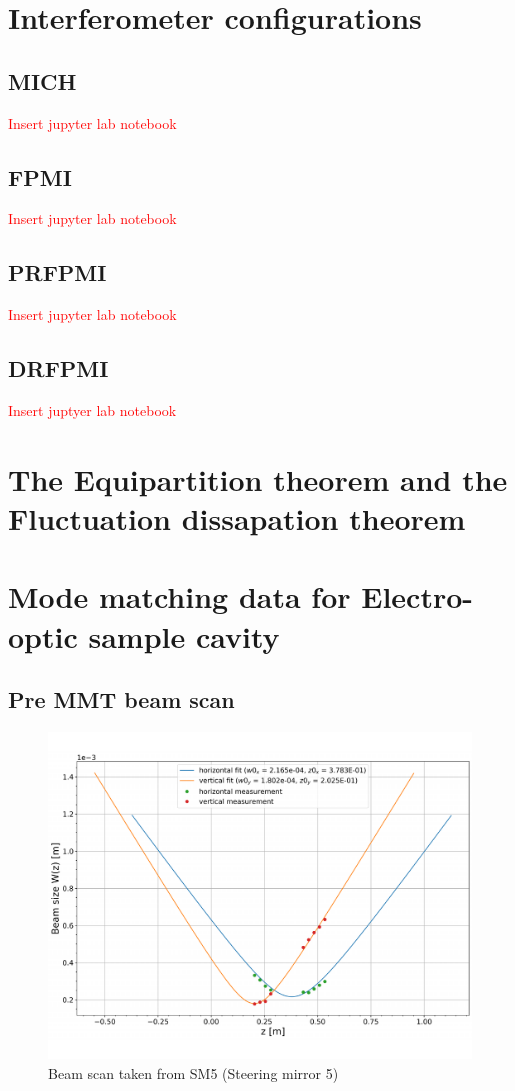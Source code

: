 

\section{Interferometer configurations}
\subsection{MICH}
\textcolor{red}{Insert jupyter lab notebook}
\subsection{FPMI}
\textcolor{red}{Insert jupyter lab notebook}
\subsection{PRFPMI}
\textcolor{red}{Insert jupyter lab notebook}
\subsection{DRFPMI}
\textcolor{red}{Insert juptyer lab notebook}


\section{The Equipartition theorem and the Fluctuation dissapation theorem}

\newpage


\section{Mode matching data for Electro-optic sample cavity}
\subsection{Pre MMT beam scan}

\begin{figure}[H]
\includegraphics[width=\textwidth]{figs/ALGAAS/beam_scans/12_18_2020_preMMT.pdf}
\caption{Beam scan taken from SM5 (Steering mirror 5)}
\label{fig:beam_scan_2020}
\end{figure}


